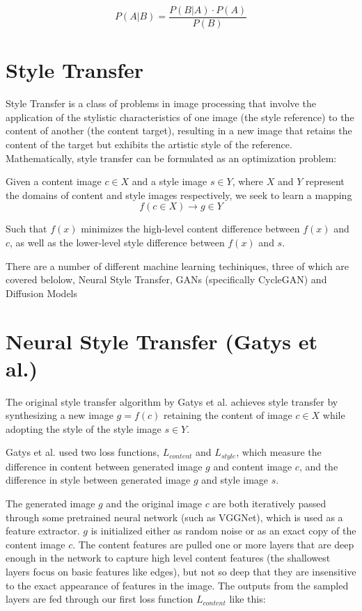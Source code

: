 \documentclass[12pt]{article}
\begin{document}
\[P(A|B) = \frac{P(B|A)\cdot P(A)}{P(B)}\]

\section{Style Transfer}
Style Transfer is a class of problems in image processing that involve the application of the stylistic characteristics of one image (the style reference) to the content of another (the content target), resulting in a new image that retains the content of the target but exhibits the artistic style of the reference. Mathematically, style transfer can be formulated as an optimization problem:

Given a content image \(c \in X\) and a style image \(s \in Y\), where \(X\) and \(Y\) represent the domains of content and style images respectively, we seek to learn a mapping \[f(c \in X) \rightarrow g \in Y\] 

Such that \(f(x)\) minimizes the high-level content difference between \(f(x)\) and \(c\), as well as the lower-level style difference between \(f(x)\) and \(s\).

There are a number of different machine learning techiniques, three of which are covered belolow, Neural Style Transfer, GANs (specifically CycleGAN) and Diffusion Models

\section{Neural Style Transfer (Gatys et al.)}

The original style transfer algorithm by Gatys et al. achieves style transfer 
by synthesizing a new image \(g = f(c)\) retaining the content of image \(c \in X\) while adopting the style of the style image \(s \in Y\). 

Gatys et al. used two loss functions, \(L_{content}\) and \(L_{style}\), which measure the difference in content between generated image \(g\) and content image \(c\), and the difference in style between generated image \(g\) and style image \(s\).

The generated image \(g\) and the original image \(c\) are both iteratively passed through some pretrained neural network (such as VGGNet), which is used as a feature extractor. \(g\) is initialized either as random noise or as an exact copy of the content image \(c\). The content features are pulled one or more layers that are deep enough in the network to capture high level content features (the shallowest layers focus on basic features like edges), but not so deep that they are insensitive to the exact appearance of features in the image. The outputs from the sampled layers are fed through our first loss function \(L_{content}\) like this:
\end{document}
